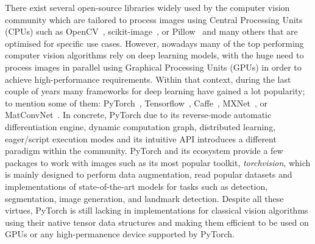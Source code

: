There exist several open-source libraries widely used by the computer vision community which are tailored to process images using Central Processing Units (CPUs) such as OpenCV~\citep{opencv}, scikit-image~\citep{scikit-image}, or Pillow~\citep{pillow} and many others that are optimised for specific use cases. However, nowadays many of the top performing computer vision algorithms rely on deep learning models, with the huge need to process images in parallel using Graphical Processing Units (GPUs) in order to achieve high-performance requirements. Within that context, during the last couple of years many frameworks for deep learning have gained a lot popularity; to mention some of them: PyTorch~\citep{pytorch}, Tensorflow~\citep{tensorflow2015-whitepaper}, Caffe~\citep{caffe}, MXNet~\citep{journals/corr/ChenLLLWWXXZZ15}, or MatConvNet~\citep{Vedaldi15}. In concrete, PyTorch \citep{pytorch} due to its reverse-mode automatic differentiation engine, dynamic computation graph, distributed learning, eager/script execution modes and its intuitive API introduces a different paradigm within the community. PyTorch and its ecosystem provide a few packages to work with images such as its most popular toolkit, \textit{torchvision}, which is mainly designed to perform data augmentation, read popular datasets and implementations of state-of-the-art models for tasks such as detection, segmentation, image generation, and landmark detection. Despite all these virtues, PyTorch is still lacking in implementations for classical vision algorithms using their native tensor data structures and making them efficient to be used on GPUs or any high-permanence device supported by PyTorch.

